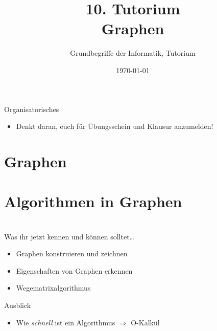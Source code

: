 




\title[Graphen]{10. Tutorium\\ Graphen}
\subtitle{Grundbegriffe der Informatik, Tutorium \hashtag\mytutnumber}
\date{\today}

\usetikzlibrary{matrix}
\usetikzlibrary{arrows.meta}
\usetikzlibrary{automata}
\usetikzlibrary{tikzmark}


\titleframe

\begin{frame}{Organisatorisches}
\begin{itemize}
    \item Denkt daran, euch für Übungsschein und Klausur anzumelden!
\end{itemize}
\end{frame}

\roadmap


\section{Graphen}


\section{Algorithmen in Graphen}


\section{}
	\begin{frame}{Was ihr jetzt kennen und können solltet\dots}
			\begin{itemize}
				\item Graphen konstruieren und zeichnen
				\item Eigenschaften von Graphen erkennen
				\item Wegematrixalgorithmus
			\end{itemize}
	
	\end{frame}
	\begin{frame}{Ausblick}
		\begin{itemize}
			\item Wie \emph{schnell} ist ein Algorithmus $\Rightarrow$ O-Kalkül 
		\end{itemize}
	\end{frame}
\section{}
\questionframe
\lastframe
{}
